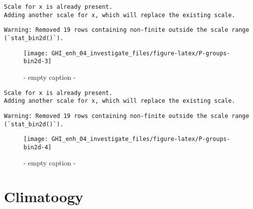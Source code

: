\documentclass[
  10pt,
  a4paper,oneside]{article}
\begin{document}
\begin{verbatim}
Scale for x is already present.
Adding another scale for x, which will replace the existing scale.
\end{verbatim}

\begin{verbatim}
Warning: Removed 19 rows containing non-finite outside the scale range
(`stat_bin2d()`).
\end{verbatim}

\begin{figure}[H]

{\centering \texttt{[image: GHI\_enh\_04\_investigate\_files/figure-latex/P-groups-bin2d-3]} 

}

\caption{ - empty caption - }\label{fig:P-groups-bin2d-3}
\end{figure}

\begin{verbatim}
Scale for x is already present.
Adding another scale for x, which will replace the existing scale.
\end{verbatim}

\begin{verbatim}
Warning: Removed 19 rows containing non-finite outside the scale range
(`stat_bin2d()`).
\end{verbatim}

\begin{figure}[H]

{\centering \texttt{[image: GHI\_enh\_04\_investigate\_files/figure-latex/P-groups-bin2d-4]} 

}

\caption{ - empty caption - }\label{fig:P-groups-bin2d-4}
\end{figure}

\hypertarget{climatoogy}{%
\section{Climatoogy}\label{climatoogy}}
\end{document}
